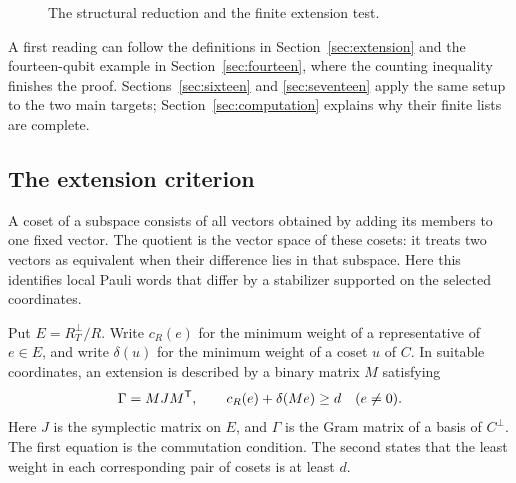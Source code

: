\begin{figure}[htbp]
\centering
{}
\caption{The structural reduction and the finite extension test.}
\label{fig:proof-flow}
\end{figure}

A first reading can follow the definitions in Section~\ref{sec:extension}
and the fourteen-qubit example in Section~\ref{sec:fourteen}, where the
counting inequality finishes the proof. Sections~\ref{sec:sixteen} and
\ref{sec:seventeen} apply the same setup to the two main targets;
Section~\ref{sec:computation} explains why their finite lists are complete.

\subsection{The extension criterion}

A coset of a subspace consists of all vectors obtained by adding its
members to one fixed vector. The quotient is the vector space of these
cosets: it treats two vectors as equivalent when their difference lies
in that subspace. Here this identifies local Pauli words that differ by
a stabilizer supported on the selected coordinates.

Put \(E=R_T^\perp/R\). Write \(c_R(e)\) for the minimum weight of a
representative of \(e\in E\), and write \(\delta(u)\) for the minimum
weight of a coset \(u\) of \(C\). In suitable coordinates, an extension
is described by a binary matrix \(M\) satisfying
\begin{equation}\label{eq:intro-criterion}
 \Gamma=MJM^\mathsf T,\qquad c_R(e)+\delta(Me)\geq d\quad(e\ne0).
\end{equation}
Here \(J\) is the symplectic matrix on \(E\), and \(\Gamma\) is the
Gram matrix of a basis of \(C^\perp\). The first equation is the
commutation condition. The second states that the least weight in each
corresponding pair of cosets is at least \(d\).

